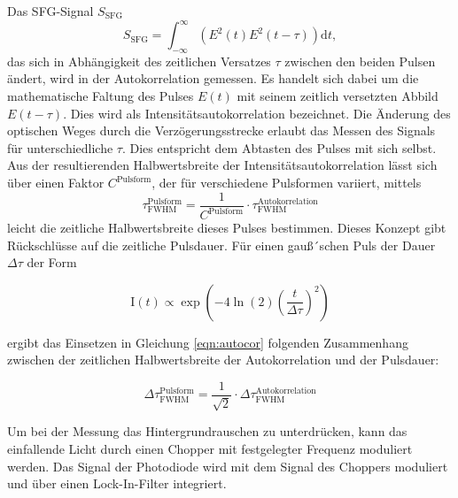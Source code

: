         \FloatBarrier
        Das SFG-Signal $S_{\text{SFG}}$
        \begin{equation}
            S_{\text{SFG}} = \int_{-\infty}^{\infty} \left(E^2 (t)  E^2 (t-\tau)\right) \text{d}t ,
            \label{eqn:autocor}
        \end{equation}
        das sich in Abhängigkeit des zeitlichen Versatzes $\tau$ zwischen den beiden Pulsen ändert, wird in der Autokorrelation gemessen. Es handelt sich dabei um die mathematische Faltung des Pulses $E(t)$ 
        mit seinem zeitlich versetzten Abbild $E(t - \tau)$. Dies wird als Intensitätsautokorrelation bezeichnet. Die Änderung des optischen Weges durch die Verzögerungsstrecke erlaubt das Messen des Signals 
        für unterschiedliche $\tau$. Dies entspricht dem Abtasten des Pulses mit sich selbst. Aus der resultierenden Halbwertsbreite der Intensitätsautokorrelation lässt sich über einen Faktor 
        $C^{\text{Pulsform}}$, der für verschiedene Pulsformen variiert, mittels 
        \begin{equation*}
            \tau_{\text{FWHM}}^{\text{Pulsform}} = \frac{1}{C^{\text{Pulsform}}} \cdot \tau_{\text{FWHM}}^{\text{Autokorrelation}}
        \end{equation*}
        leicht die zeitliche Halbwertsbreite dieses Pulses bestimmen. Dieses Konzept gibt Rückschlüsse auf die zeitliche Pulsdauer. 
        Für einen gauß´schen Puls der Dauer $\Delta \tau$ der Form
 
        \begin{equation}
          \text{I}(t) \propto \exp\left(-4\ln(2)\left(\frac{t}{\Delta \tau}\right)^2\right)
          \label{eqn:IntGauss}
        \end{equation}

        ergibt das Einsetzen in Gleichung \ref{eqn:autocor} folgenden Zusammenhang zwischen der zeitlichen Halbwertsbreite der Autokorrelation und der Pulsdauer:

        \begin{equation*}
          \Delta\tau_{\text{FWHM}}^{\text{Pulsform}} = \frac{1}{\sqrt{2}} \cdot \Delta\tau_{\text{FWHM}}^{\text{Autokorrelation}}
          \label{eqn:tautau}
        \end{equation*}
        
        Um bei der Messung das Hintergrundrauschen zu unterdrücken, kann das 
        einfallende Licht durch einen Chopper mit festgelegter Frequenz moduliert werden. Das Signal der Photodiode wird mit dem Signal des Choppers moduliert und über einen Lock-In-Filter integriert.


